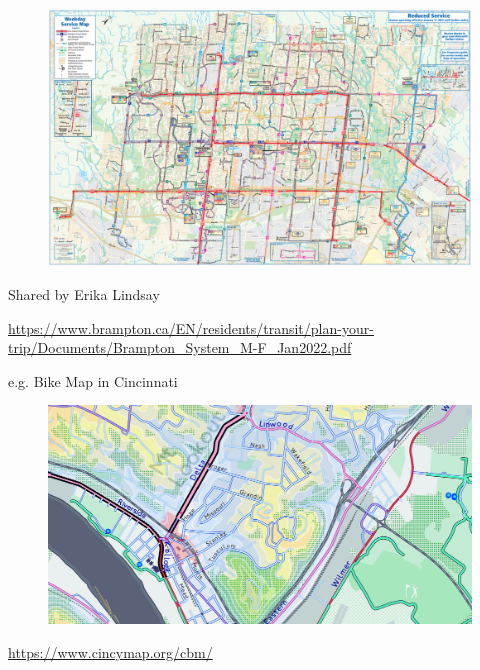 \documentclass[aspectratio=169]{beamer}
\begin{document}
\begin{frame}
	
	\begin{figure}
		\centering
		\includegraphics[width=0.93\linewidth]{images/brampton_map.png}
	\end{figure}
	
	\tiny Shared by Erika Lindsay 
	
	\tiny \url{https://www.brampton.ca/EN/residents/transit/plan-your-trip/Documents/Brampton_System_M-F_Jan2022.pdf}
	
\end{frame}








\begin{frame}
	
	e.g. Bike Map in Cincinnati
	
	\begin{figure}
		\centering
		\includegraphics[width=1\linewidth]{images/bike_map_1.png}
	\end{figure}
	
	\tiny \url{https://www.cincymap.org/cbm/}
	
\end{frame}
\end{document}
